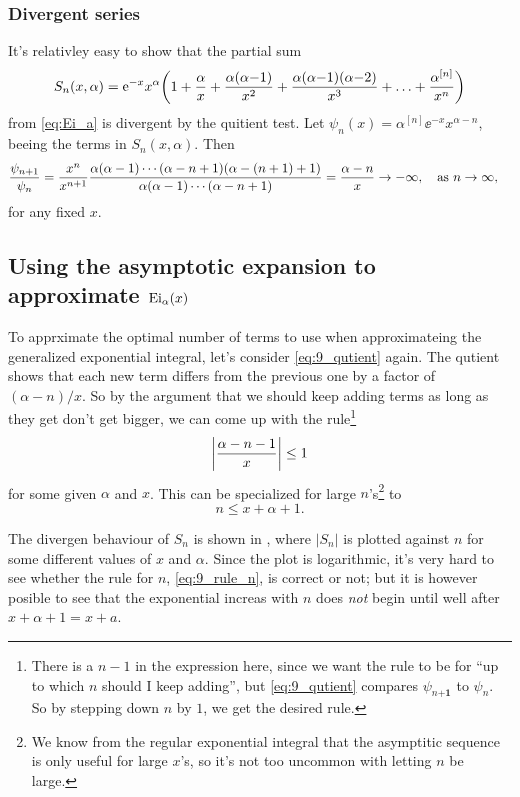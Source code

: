 \documentclass[11pt,letter, swedish, english
]{article}
\newcommand{\Ei}{\ensuremath\mathrm{Ei}}
\begin{document}
\subsubsection*{Divergent series}
It's relativley easy to show that the partial sum
\begin{equation}
S_n(x, \alpha) = \mathrm{e}^{-x}x^\alpha \qty(
1+\frac{\alpha}{x} + \frac{\alpha(\alpha{-}1)}{x^2} 
+ \frac{\alpha(\alpha{-}1)(\alpha{-}2)}{x^3} +\ldots
+ \frac{\alpha^{[n]}}{x^n})
\end{equation}
from \eqref{eq:Ei_a} is divergent by the quitient test. 
Let $\psi_n(x) = \alpha^{[n]}\ee^{-x}x^{\alpha-n}$, beeing the terms
in $S_n(x, \alpha)$. Then
\begin{equation}\label{eq:9_qutient}
\frac{\psi_{n+1}}{\psi_n}
=\frac{x^n}{x^{n+1}}\frac{\alpha(\alpha-1)\cdots(\alpha-n+1)(\alpha-(n+1)+1)}
{\alpha(\alpha-1)\cdots(\alpha-n+1)}
=\frac{\alpha-n}{x} \to -\infty
\as n\to \infty\qcomma 
\end{equation}
for any fixed $x$.

\subsection{Using the asymptotic expansion to approximate $\Ei_\alpha(x)$}
To apprximate the optimal number of terms to use when approximateing
the generalized exponential integral, let's consider
\eqref{eq:9_qutient} again. The qutient shows that each new term
differs from the previous one by a factor of $(\alpha-n)/x$. So by the
argument that we should keep adding terms as long as they get don't
get bigger, we can come up with the rule\footnote{There is a $n-1$ in
  the expression here, since we want the rule to be for ``up to which
  $n$ should I keep adding'', but \eqref{eq:9_qutient} compares
  $\psi_{n\mathbf{+1}}$ to $\psi_n$. So by stepping down $n$ by $1$,
  we get the desired rule.} 
\begin{equation}
\abs{\frac{\alpha-n-1}{x}}\le 1
\end{equation}
for some given $\alpha$ and $x$. This can be specialized for large
$n$'s\footnote{We know from the regular exponential integral that the
  asymptitic sequence is only useful for large $x$'s, so it's not too
  uncommon with letting $n$ be large.}
to
\begin{equation}\label{eq:9_rule_n}
n\le x+\alpha+1.
\end{equation}

The divergen behaviour of $S_n$ is shown in , where
$|S_n|$ is plotted against $n$ for some different values of $x$ and
$\alpha$. Since the plot is logarithmic, it's very hard to see whether
the rule for $n$, \eqref{eq:9_rule_n}, is correct or not; but it is
however posible to see that the exponential increas with $n$ does
\emph{not} begin until well after $x+\alpha+1=x+a$.
\end{document}
